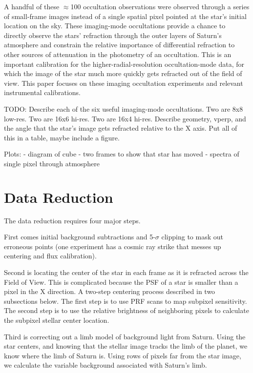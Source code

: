 \documentclass[twocolumn, twocolappendix, numberedappendix, linenumbers]{aastex631}
\begin{document}
A handful of these $\approx$100 occultation observations were observed through
a series of small-frame images instead of a single spatial pixel pointed at the
star's initial location on the sky.  These imaging-mode occultations provide a
chance to directly observe the stars' refraction through the outer layers of
Saturn's atmosphere and constrain the relative importance of differential
refraction to other sources of attenuation in the photometry of an occultation.
This is an important calibration for the higher-radial-resolution
occultation-mode data, for which the image of the star much more quickly gets
refracted out of the field of view. This paper focuses on these imaging
occultation experiments and relevant instrumental calibrations.

TODO: Describe each of the six useful imaging-mode occultations. Two are 8x8
low-res. Two are 16x6 hi-res. Two are 16x4 hi-res. Describe geometry, vperp,
and the angle that the star's image gets refracted relative to the X axis.
Put all of this in a table, maybe include a figure.

Plots:
- diagram of cube
- two frames to show that star has moved
- spectra of single pixel through atmosphere

\section{Data Reduction} \label{sec:data}
The data reduction requires four major steps.

First comes initial background subtractions and 5-$\sigma$ clipping to mask out
erroneous points (one experiment has a cosmic ray strike that messes up
centering and flux calibration).

Second is locating the center of the star in each frame as it is refracted
across the Field of View. This is complicated because the PSF of a star is
smaller than a pixel in the X direction. A two-step centering process described
in two subsections below. The first step is to use PRF scans to map subpixel
sensitivity. The second step is to use the relative brightness of neighboring
pixels to calculate the subpixel stellar center location.

Third is correcting out a limb model of background light from Saturn. Using the
star centers, and knowing that the stellar image tracks the limb of the planet,
we know where the limb of Saturn is. Using rows of pixels far from the star
image, we calculate the variable background associated with Saturn's limb.
\end{document}
